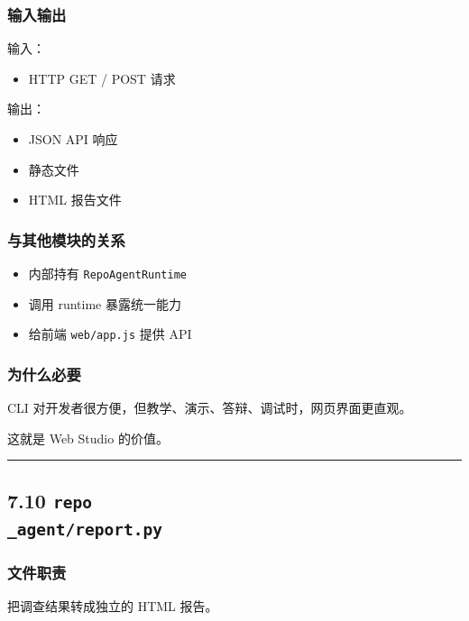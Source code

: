 \documentclass[UTF8,12pt,openany]{ctexbook}
\begin{document}
\subsubsection{输入输出}

输入：\par

\begin{itemize}
\item HTTP GET / POST 请求
\end{itemize}

输出：\par

\begin{itemize}
\item JSON API 响应
\item 静态文件
\item HTML 报告文件
\end{itemize}

\subsubsection{与其他模块的关系}

\begin{itemize}
\item 内部持有 \texttt{RepoAgentRuntime}
\item 调用 runtime 暴露统一能力
\item 给前端 \texttt{web/app.js} 提供 API
\end{itemize}

\subsubsection{为什么必要}

CLI 对开发者很方便，但教学、演示、答辩、调试时，网页界面更直观。  \par
这就是 Web Studio 的价值。\par

\hrule

\subsection{7.10 \texttt{repo\\_agent/report.py}}

\subsubsection{文件职责}

把调查结果转成独立的 HTML 报告。\par
\end{document}
